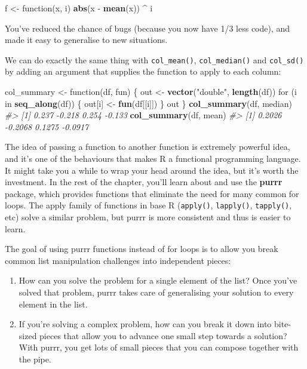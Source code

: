 \documentclass[]{book}
\newenvironment{Shaded}{\begin{snugshade}}{\end{snugshade}}
\newcommand{\KeywordTok}[1]{\textcolor[rgb]{0.13,0.29,0.53}{\textbf{{#1}}}}
\newcommand{\StringTok}[1]{\textcolor[rgb]{0.31,0.60,0.02}{{#1}}}
\newcommand{\CommentTok}[1]{\textcolor[rgb]{0.56,0.35,0.01}{\textit{{#1}}}}
\newcommand{\NormalTok}[1]{{#1}}
\begin{document}
\begin{Shaded}
\begin{Highlighting}[]
\NormalTok{f <-}\StringTok{ }\NormalTok{function(x, i) }\KeywordTok{abs}\NormalTok{(x -}\StringTok{ }\KeywordTok{mean}\NormalTok{(x)) ^}\StringTok{ }\NormalTok{i}
\end{Highlighting}
\end{Shaded}

You've reduced the chance of bugs (because you now have 1/3 less code),
and made it easy to generalise to new situations.

We can do exactly the same thing with \texttt{col\_mean()},
\texttt{col\_median()} and \texttt{col\_sd()} by adding an argument that
supplies the function to apply to each column:

\begin{Shaded}
\begin{Highlighting}[]
\NormalTok{col_summary <-}\StringTok{ }\NormalTok{function(df, fun) \{}
  \NormalTok{out <-}\StringTok{ }\KeywordTok{vector}\NormalTok{(}\StringTok{"double"}\NormalTok{, }\KeywordTok{length}\NormalTok{(df))}
  \NormalTok{for (i in }\KeywordTok{seq_along}\NormalTok{(df)) \{}
    \NormalTok{out[i] <-}\StringTok{ }\KeywordTok{fun}\NormalTok{(df[[i]])}
  \NormalTok{\}}
  \NormalTok{out}
\NormalTok{\}}
\KeywordTok{col_summary}\NormalTok{(df, median)}
\CommentTok{#> [1]  0.237 -0.218  0.254 -0.133}
\KeywordTok{col_summary}\NormalTok{(df, mean)}
\CommentTok{#> [1]  0.2026 -0.2068  0.1275 -0.0917}
\end{Highlighting}
\end{Shaded}

The idea of passing a function to another function is extremely powerful
idea, and it's one of the behaviours that makes R a functional
programming language. It might take you a while to wrap your head around
the idea, but it's worth the investment. In the rest of the chapter,
you'll learn about and use the \textbf{purrr} package, which provides
functions that eliminate the need for many common for loops. The apply
family of functions in base R (\texttt{apply()}, \texttt{lapply()},
\texttt{tapply()}, etc) solve a similar problem, but purrr is more
consistent and thus is easier to learn.

The goal of using purrr functions instead of for loops is to allow you
break common list manipulation challenges into independent pieces:

\begin{enumerate}
\def\labelenumi{\arabic{enumi}.}
\item
  How can you solve the problem for a single element of the list? Once
  you've solved that problem, purrr takes care of generalising your
  solution to every element in the list.
\item
  If you're solving a complex problem, how can you break it down into
  bite-sized pieces that allow you to advance one small step towards a
  solution? With purrr, you get lots of small pieces that you can
  compose together with the pipe.
\end{enumerate}
\end{document}
